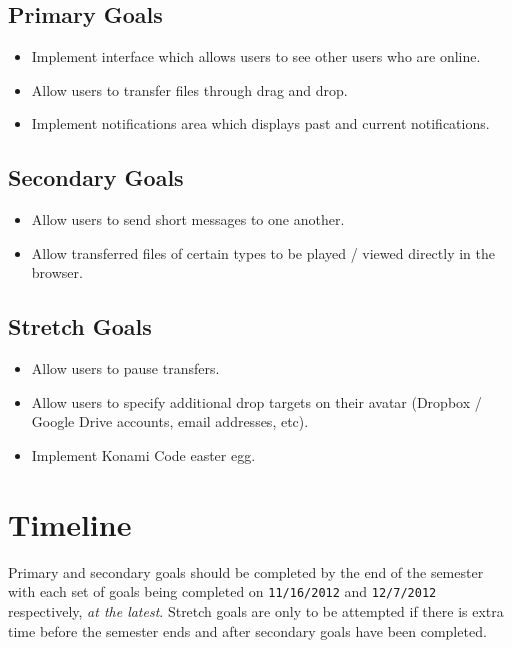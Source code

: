 \documentclass[letterpaper, 10pt]{article}
\begin{document}
	\subsection{Primary Goals}
	\begin{itemize}
		\item Implement interface which allows users to see other users who are online.
		\item Allow users to transfer files through drag and drop.
		\item Implement notifications area which displays past and current notifications.
	\end{itemize}

	\subsection{Secondary Goals}
	\begin{itemize}
		\item Allow users to send short messages to one another.
		\item Allow transferred files of certain types to be played / viewed directly in the browser.
	\end{itemize}

	\subsection{Stretch Goals}
	\begin{itemize}
		\item Allow users to pause transfers.
		\item Allow users to specify additional drop targets on their avatar (Dropbox / Google Drive accounts, email addresses, etc).
		\item Implement Konami Code easter egg.
	\end{itemize}

	\section{Timeline}
	Primary and secondary goals should be completed by the end of the semester with each set of goals being completed on \texttt{11/16/2012} and \texttt{12/7/2012} respectively, \emph{at the latest}. Stretch goals are only to be attempted if there is extra time before the semester ends and after secondary goals have been completed.
\end{document}
